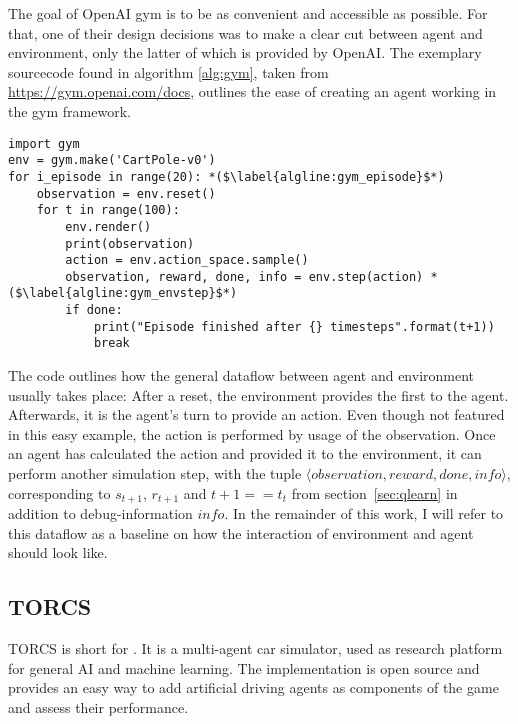 The goal of OpenAI gym is to be as convenient and accessible as possible. For that, one of their design decisions was to make a clear cut between agent and environment, only the latter of which is provided by OpenAI. The exemplary sourcecode found in algorithm \ref{alg:gym}, taken from \url{https://gym.openai.com/docs}, outlines the ease of creating an agent working in the gym framework.
\begin{algorithm}[h]
\begin{lstlisting}[style=Python]
import gym
env = gym.make('CartPole-v0')
for i_episode in range(20): *($\label{algline:gym_episode}$*)
	observation = env.reset()
	for t in range(100):
		env.render()
		print(observation)
		action = env.action_space.sample()
		observation, reward, done, info = env.step(action) *($\label{algline:gym_envstep}$*)
		if done:
			print("Episode finished after {} timesteps".format(t+1))
			break
\end{lstlisting}%
\caption{Interaction with the OpenAI gym environment}
\label{alg:gym}
\end{algorithm}


The code outlines how the general dataflow between agent and environment usually takes place: After a reset, the environment provides the first  to the agent. Afterwards, it is the agent's turn to provide an action. Even though not featured in this easy example, the action is performed by usage of the observation. Once an agent has calculated the action and provided it to the environment, it can perform another simulation step, with the tuple $\langle observation, reward, done, info\rangle$, corresponding to $s_{t+1}$, $r_{t+1}$ and $t+1==t_t$ from section~\ref{sec:qlearn} in addition to debug-information $info$. In the remainder of this work, I will refer to this dataflow as a baseline on how the interaction of environment and agent should look like.

\subsection{TORCS}

TORCS is short for \cite{wymann_torcs_2013, wymann_torcs_2015}. It is a multi-agent car simulator, used as research platform for general AI and machine learning. The implementation is open source and provides an easy way to add artificial driving agents as components of the game and assess their performance. 

